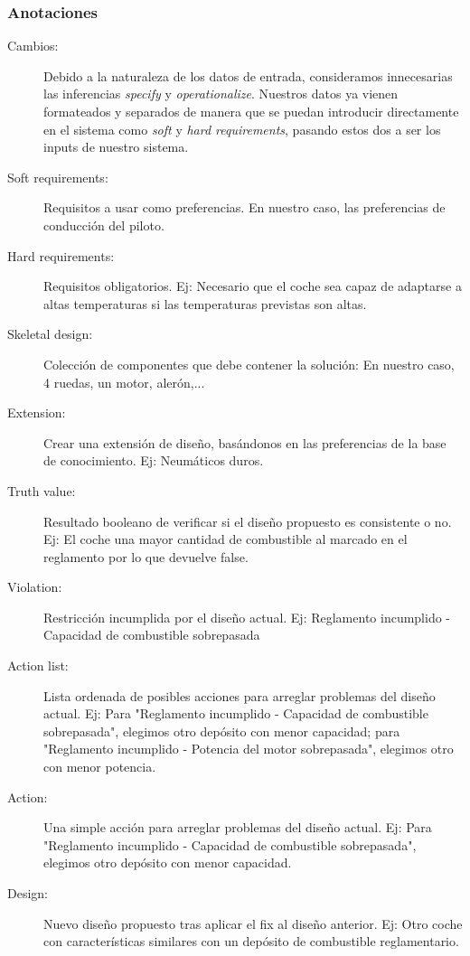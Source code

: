 \documentclass[12pt,a4paper,twoside,spanish]{article}      %
\begin{document}
\subsubsection {Anotaciones}
\begin {description}
    \item [Cambios:] Debido a la naturaleza de los datos de entrada, consideramos innecesarias las inferencias \textit {specify} y \textit {operationalize}. Nuestros datos ya vienen formateados y separados de manera que se puedan introducir directamente en el sistema como \textit {soft} y \textit {hard requirements}, pasando estos dos a ser los inputs de nuestro sistema.
    \item [Soft requirements:] Requisitos a usar como preferencias. En nuestro caso, las preferencias de conducción del piloto.
    \item [Hard requirements:] Requisitos obligatorios. Ej: Necesario que el coche sea capaz de adaptarse a altas temperaturas si las temperaturas previstas son altas.
    \item [Skeletal design:] Colección de componentes que debe contener la solución: En nuestro caso, 4 ruedas, un motor, alerón,...
    \item [Extension:] Crear una extensión de diseño, basándonos en las preferencias de la base de conocimiento. Ej: Neumáticos duros.
    \item [Truth value:] Resultado booleano de verificar si el diseño propuesto es consistente o no. Ej: El coche una mayor cantidad de combustible al marcado en el reglamento por lo que devuelve false.
    \item [Violation:] Restricción incumplida por el diseño actual. Ej: Reglamento incumplido - Capacidad de combustible sobrepasada
    \item [Action list:] Lista ordenada de posibles acciones para arreglar problemas del diseño actual. Ej: Para "Reglamento incumplido - Capacidad de combustible sobrepasada", elegimos otro depósito con menor capacidad; para "Reglamento incumplido - Potencia del motor sobrepasada", elegimos otro con menor potencia.
    \item [Action:] Una simple acción para arreglar problemas del diseño actual. Ej: Para "Reglamento incumplido - Capacidad de combustible sobrepasada", elegimos otro depósito con menor capacidad.
    \item [Design:] Nuevo diseño propuesto tras aplicar el fix al diseño anterior. Ej: Otro coche con características similares con un depósito de combustible reglamentario.
\end {description}
\end{document}
